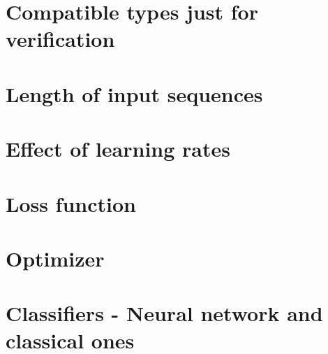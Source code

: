 \section{Compatible types just for verification}

\section{Length of input sequences}

\section{Effect of learning rates}

\section{Loss function}

\section{Optimizer}

\section{Classifiers - Neural network and classical ones}

